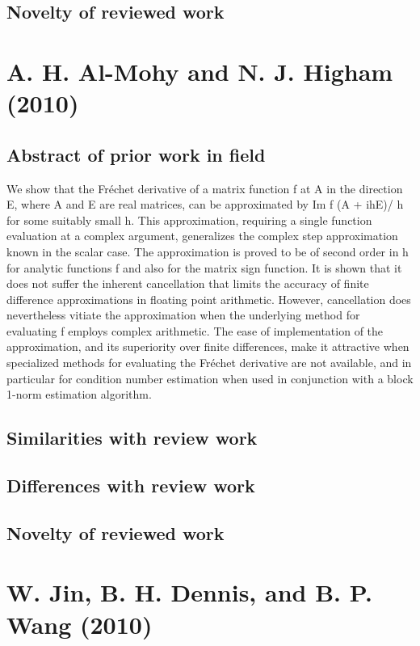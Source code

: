\documentclass[10pt,letterpaper,draft]{article}
\begin{document}
\subsection{Novelty of reviewed work}

\section{A. H. Al-Mohy and N. J. Higham (2010)}
\subsection{Abstract of prior work in field}

We show that the Fréchet derivative of a matrix function f at A in the
direction E, where A and E are real matrices, can be approximated by Im f (A +
ihE)/ h for some suitably small h. This approximation, requiring a single
function evaluation at a complex argument, generalizes the complex step
approximation known in the scalar case. The approximation is proved to be of
second order in h for analytic functions f and also for the matrix sign
function. It is shown that it does not suffer the inherent cancellation that
limits the accuracy of finite difference approximations in floating point
arithmetic. However, cancellation does nevertheless vitiate the approximation
when the underlying method for evaluating f employs complex arithmetic.  The
ease of implementation of the approximation, and its superiority over finite
differences, make it attractive when specialized methods for evaluating the
Fréchet derivative are not available, and in particular for condition number
estimation when used in conjunction with a block 1-norm estimation algorithm.

\subsection{Similarities with review work}
\subsection{Differences with review work}
\subsection{Novelty of reviewed work}

\section{W. Jin, B. H. Dennis, and B. P. Wang (2010)}
\end{document}
